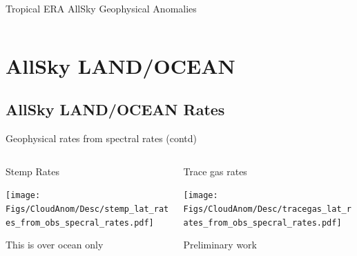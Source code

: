 \documentclass[10pt,t]{beamer}
\begin{document}
\begin{frame}{Tropical ERA AllSky Geophysical Anomalies}
\begin{columns}
\begin{column}{0.45\columnwidth}

\end{column}
\end{columns}
\end{frame}


\section{AllSky LAND/OCEAN}
\subsection{AllSky LAND/OCEAN Rates}

\begin{frame}{Geophysical rates from spectral rates (contd)}
\vspace{-0.3in}

\begin{columns}
\begin{column}{0.55\columnwidth}
\begin{block}{\footnotesize Stemp Rates}
\vspace{-0.1in}
\begin{center}
\texttt{[image: Figs/CloudAnom/Desc/stemp\_lat\_rates\_from\_obs\_specral\_rates.pdf]}
\end{center}
\footnotesize
This is over ocean only
\end{block}
\end{column}

\begin{column}{0.55\columnwidth}
\begin{block}{\footnotesize Trace gas rates}
\vspace{-0.1in}
\begin{center}
\texttt{[image: Figs/CloudAnom/Desc/tracegas\_lat\_rates\_from\_obs\_specral\_rates.pdf]}
\end{center}
\footnotesize
Preliminary work
\end{block}
\end{column}
\end{columns}
\end{frame}
\end{document}
